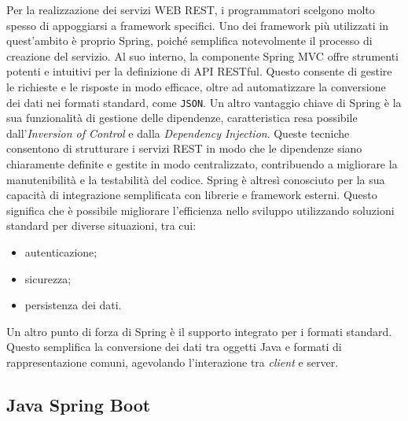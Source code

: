 Per la realizzazione dei servizi WEB REST, i programmatori scelgono molto spesso di appoggiarsi a framework specifici. Uno dei framework più utilizzati in quest’ambito è proprio Spring, poiché semplifica notevolmente il processo di creazione del servizio. Al suo interno, la componente Spring MVC offre strumenti potenti e intuitivi per la definizione di API RESTful. Questo consente di gestire le richieste e le risposte in modo efficace, oltre ad automatizzare la conversione dei dati nei formati standard, come \texttt{JSON}. Un altro vantaggio chiave di Spring è la sua funzionalità di gestione delle dipendenze, caratteristica resa possibile dall’\textit{Inversion of Control} e dalla \textit{Dependency Injection}. Queste tecniche consentono di strutturare i servizi REST in modo che le dipendenze siano chiaramente definite e gestite in modo centralizzato, contribuendo a migliorare la manutenibilità e la testabilità del codice. Spring è altresì conosciuto per la sua capacità di integrazione semplificata con librerie e framework esterni. Questo significa che è possibile migliorare l’efficienza nello sviluppo utilizzando soluzioni standard per diverse situazioni, tra cui:
\begin{itemize}
    \item autenticazione;
    \item sicurezza;
    \item persistenza dei dati.
\end{itemize}
Un altro punto di forza di Spring è il supporto integrato per i formati standard. Questo semplifica la conversione dei dati tra oggetti Java e formati di rappresentazione comuni, agevolando l'interazione tra \textit{client} e server.\cite{SPRING_spring4}

\subsection{Java Spring Boot}


